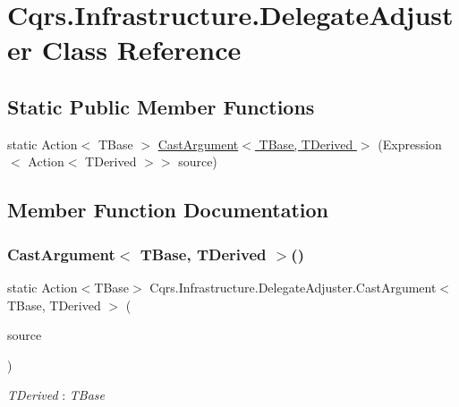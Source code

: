 \hypertarget{classCqrs_1_1Infrastructure_1_1DelegateAdjuster}{}\section{Cqrs.\+Infrastructure.\+Delegate\+Adjuster Class Reference}
\label{classCqrs_1_1Infrastructure_1_1DelegateAdjuster}
\subsection*{Static Public Member Functions}
\begin{DoxyCompactItemize}
\item 
static Action$<$ T\+Base $>$ \hyperlink{classCqrs_1_1Infrastructure_1_1DelegateAdjuster_a453c2b48b035fff6b3843e27a5cb960f}{Cast\+Argument$<$ T\+Base, T\+Derived $>$} (Expression$<$ Action$<$ T\+Derived $>$$>$ source)
\end{DoxyCompactItemize}


\subsection{Member Function Documentation}
\mbox{\label{classCqrs_1_1Infrastructure_1_1DelegateAdjuster_a453c2b48b035fff6b3843e27a5cb960f}} 
\subsubsection{\texorpdfstring{Cast\+Argument$<$ T\+Base, T\+Derived $>$()}{CastArgument< TBase, TDerived >()}}
{\footnotesize\ttfamily static Action$<$T\+Base$>$ Cqrs.\+Infrastructure.\+Delegate\+Adjuster.\+Cast\+Argument$<$ T\+Base, T\+Derived $>$ (\begin{DoxyParamCaption}\item[{Expression$<$ Action$<$ T\+Derived $>$$>$}]{source }\end{DoxyParamCaption})\hspace{0.3cm}{\ttfamily [static]}}

\begin{Desc}
\item[Type Constraints]\begin{description}
\item[{\em T\+Derived} : {\em T\+Base}]\end{description}
\end{Desc}
